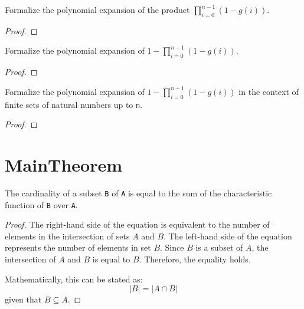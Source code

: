\begin{lemma}\label{mul_expand₃}
  \leanok
  Formalize the polynomial expansion of the product \(\prod_{i=0}^{n-1} (1 - g(i))\).
\end{lemma}
\begin{proof}
  \leanok
\end{proof}

\begin{lemma}\label{mul_expand₂}
  \leanok
  Formalize the polynomial expansion of \(1 - \prod_{i=0}^{n-1} (1 - g(i))\).
\end{lemma}
\begin{proof}
  \leanok
\end{proof}


\begin{lemma}\label{mul_expand₁}
  \leanok
  Formalize the polynomial expansion of \(1 - \prod_{i=0}^{n-1} (1 - g(i))\) in the context of finite sets of natural numbers up to \verb|n|.
\end{lemma}
\begin{proof}
  \leanok
\end{proof}


\section{MainTheorem}

\begin{lemma}\label{card_eq_sum_char_fun}
  \leanok
  The cardinality of a subset \verb|B| of \verb|A| is equal to the sum of the characteristic function of \verb|B| over \verb|A|.
\end{lemma}

\begin{proof}
  \leanok
  The right-hand side of the equation is equivalent to the number of elements in the intersection of sets $A$ and $B$. The left-hand side of the equation represents the number of elements in set $B$. Since $B$ is a subset of $A$, the intersection of $A$ and $B$ is equal to $B$. Therefore, the equality holds.

  Mathematically, this can be stated as:
  \begin{equation*}
  |B| = |A \cap B|
  \end{equation*}
  given that $B \subseteq A$.
\end{proof}

